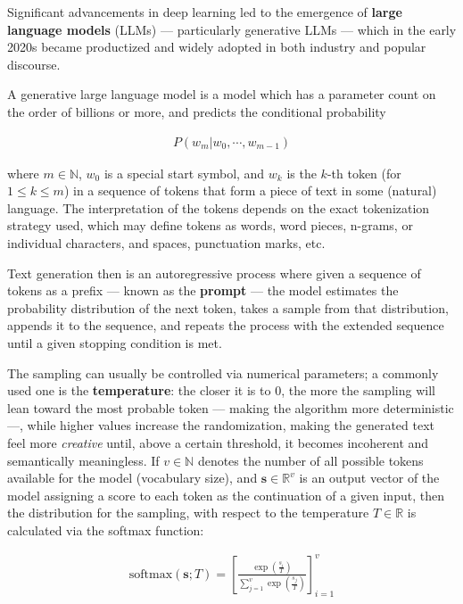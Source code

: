 \documentclass[noindent,nohyp,parspace,titlepage,twoside,12pt]{article}
\begin{document}
      Significant advancements in deep learning \cite{attention,gpt3,gpt4} led
      to the emergence of \textbf{large language models} (LLMs) --- particularly
      generative LLMs --- which in the early 2020s became productized and
      widely adopted in both industry and popular discourse.

      A generative large language model is a model which has a parameter count
      on the order of billions or more, and predicts the conditional
      probability \cite{llms}

      \begin{align} \label{eqautoreg}
        P(w_m | w_0, \cdots, w_{m-1})
      \end{align}

      where $m \in \mathbb{N}$, $w_0$ is a special start symbol, and $w_k$ is
      the $k$-th token (for $1 \le k \le m$) in a sequence of tokens that form
      a piece of text in some (natural) language. The interpretation of the
      tokens depends on the exact tokenization strategy used, which may define
      tokens as words, word pieces, n-grams, or individual characters, and
      spaces, punctuation marks, etc.

      Text generation then is an autoregressive process where given a
      sequence of tokens as a prefix --- known as the \textbf{prompt} --- the
      model estimates the probability distribution of the next token, takes a
      sample from that distribution, appends it to the sequence, and repeats
      the process with the extended sequence until a given stopping condition
      is met.

      The sampling can usually be controlled via numerical parameters; a
      commonly used one is the \textbf{temperature}: the closer it is to 0, the
      more the sampling will lean toward the most probable token --- making the
      algorithm more deterministic ---, while higher values increase the
      randomization, making the generated text feel more \emph{creative} until,
      above a certain threshold, it becomes incoherent and semantically
      meaningless. If $v \in \mathbb{N}$ denotes the number of all possible
      tokens available for the model (vocabulary size), and
      $\mathbf{s} \in \mathbb{R}^v$ is an output vector of the model assigning
      a score to each token as the continuation of a given input, then the
      distribution for the sampling, with respect to the temperature $T \in
      \mathbb{R}$ is calculated via the softmax function:

      \begin{align} \label{eqsoftmax}
        \text{softmax}(\mathbf{s};T)
          = \left[
              \frac{\exp(\frac{s_i}{T})}{\sum_{j=1}^v \exp(\frac{s_j}{T})}
            \right]_{i=1}^v
      \end{align}
\end{document}
